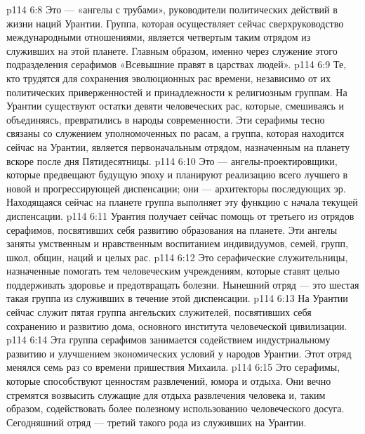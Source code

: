 \vs p114 6:8 \pc {}\bibnobreakspace {} Это --- «ангелы с трубами», руководители политических действий в жизни наций Урантии. Группа, которая осуществляет сейчас сверхруководство международными отношениями, является четвертым таким отрядом из служивших на этой планете. Главным образом, именно через служение этого подразделения серафимов «Всевышние правят в царствах людей».
\vs p114 6:9 \pc {}\bibnobreakspace {} Те, кто трудятся для сохранения эволюционных рас времени, независимо от их политических приверженностей и принадлежности к религиозным группам. На Урантии существуют остатки девяти человеческих рас, которые, смешиваясь и объединяясь, превратились в народы современности. Эти серафимы тесно связаны со служением уполномоченных по расам, а группа, которая находится сейчас на Урантии, является первоначальным отрядом, назначенным на планету вскоре после дня Пятидесятницы.
\vs p114 6:10 \pc {}\bibnobreakspace {} Это --- ангелы\hyp{}проектировщики, которые предвещают будущую эпоху и планируют реализацию всего лучшего в новой и прогрессирующей диспенсации; они --- архитекторы последующих эр. Находящаяся сейчас на планете группа выполняет эту функцию с начала текущей диспенсации.
\vs p114 6:11 \pc {}\bibnobreakspace {} Урантия получает сейчас помощь от третьего из отрядов серафимов, посвятивших себя развитию образования на планете. Эти ангелы заняты умственным и нравственным воспитанием индивидуумов, семей, групп, школ, общин, наций и целых рас.
\vs p114 6:12 \pc {}\bibnobreakspace {} Это серафические служительницы, назначенные помогать тем человеческим учреждениям, которые ставят целью поддерживать здоровье и предотвращать болезни. Нынешний отряд --- это шестая такая группа из служивших в течение этой диспенсации.
\vs p114 6:13 \pc {}\bibnobreakspace {} На Урантии сейчас служит пятая группа ангельских служителей, посвятивших себя сохранению и развитию дома, основного института человеческой цивилизации.
\vs p114 6:14 \pc {}\bibnobreakspace {} Эта группа серафимов занимается содействием индустриальному развитию и улучшением экономических условий у народов Урантии. Этот отряд менялся семь раз со времени пришествия Михаила.
\vs p114 6:15 \pc {}\bibnobreakspace {} Это серафимы, которые способствуют ценностям развлечений, юмора и отдыха. Они вечно стремятся возвысить служащие для отдыха развлечения человека и, таким образом, содействовать более полезному использованию человеческого досуга. Сегодняшний отряд --- третий такого рода из служивших на Урантии.
